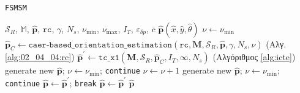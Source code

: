 \begin{algorithm}
  \caption{\texttt{FSMSM}}
  \label{alg:algorithm_fsmsm}
  \begin{spacing}{1.5}
  \begin{algorithmic}[1]
    \REQUIRE $\mathcal{S}_R$, $\mathbb{M}$, $\hat{\bm{p}}$, $\texttt{rc}$,  $\gamma$, $N_s$, $\nu_{\min}$, $\nu_{\max}$, $I_T$, $\varepsilon_{\delta p}$, $\overline{c}$
    \ENSURE $\hat{\bm{p}}(\hat{x}, \hat{y}, \hat{\theta})$
    \STATE $\nu \leftarrow \nu_{\min}$
    \WHILE {$\nu \leq \nu_{\max}$}
      \STATE $\hat{\bm{p}}_C \leftarrow \texttt{caer-based\_orientation\_estimation}(\texttt{rc}, \bm{M}, \mathcal{S}_R, \hat{\bm{p}}, \gamma, N_s, \nu)$ \hfill (Αλγ. \ref{alg:02_04_04:rc})
      \STATE $\hat{\bm{p}}^{\prime} \leftarrow \texttt{tc\_x1}(\bm{M}, \mathcal{S}_R, \hat{\bm{p}}_C, I_T, \infty, N_s)$  \hfill (Αλγόριθμος \ref{alg:icte})
        \STATE generate new $\hat{\bm{p}}$; $\nu \leftarrow \nu_{\min}$; \texttt{continue}
      \ENDIF {}
        \STATE $\nu \leftarrow \nu + 1$
      \ENDIF {}
          \STATE generate new $\hat{\bm{p}}$; $\nu \leftarrow \nu_{\min}$; \texttt{continue}
        \ELSE
          \STATE $\hat{\bm{p}} \leftarrow \hat{\bm{p}}^{\prime}$; \texttt{break}
        \ENDIF
      \ENDIF {}
      \STATE $\hat{\bm{p}} \leftarrow \hat{\bm{p}}^{\prime}$
    \ENDWHILE
    \RETURN $\hat{\bm{p}}$
  \end{algorithmic}
  \end{spacing}
\end{algorithm}
